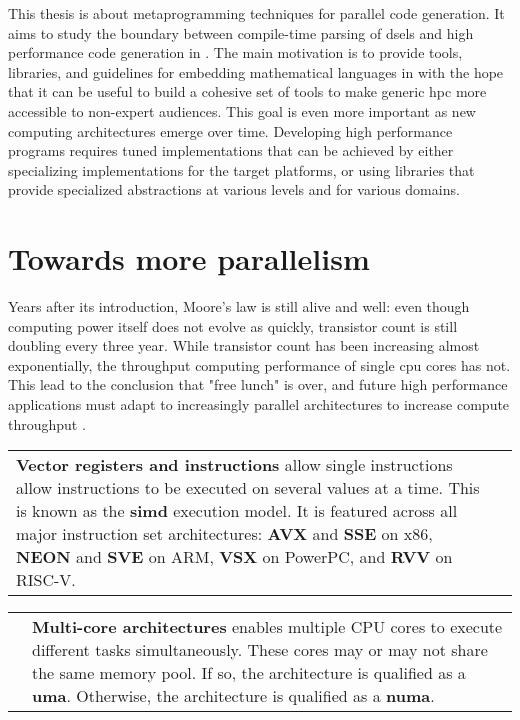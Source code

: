 \documentclass[main]{subfiles}
\begin{document}
This thesis is about metaprogramming techniques for parallel code generation.
It aims to study the boundary between compile-time parsing of
\glspl{dsel} and high performance code generation in \cpp.
The main motivation is to provide tools, libraries, and guidelines for embedding
mathematical languages in \cpp with the hope that it can be useful to build a
cohesive set of tools to make generic \gls{hpc} more accessible
to non-expert audiences. This goal is even more important as new computing
architectures emerge over time. Developing high performance programs requires
tuned implementations that can be achieved by either specializing
implementations for the target platforms, or using libraries that provide
specialized abstractions at various levels and for various domains.

\section*{
  Towards more parallelism
}

Years after its introduction, Moore's law is still alive and well:
even though computing power itself does not evolve as quickly,
transistor count is still doubling every three year.
While transistor count has been increasing almost exponentially,
the throughput computing performance of single \gls{cpu} cores has not.
This lead to the conclusion that "free lunch" is over, and future
high performance applications must adapt to increasingly parallel architectures
to increase compute throughput
\cite{concurrency-revolution, doi:10.1142/S0129626404001829}.

\begin{center}
\begin{tabular}{p{} p{}}
\textbf{Vector registers and instructions}\footnotemark{} allow single instructions allow
instructions to be executed on several values at a time. This is known as
the \textbf{\gls{simd}} execution model. It is featured across all major
instruction set architectures:
\textbf{AVX} and \textbf{SSE} on x86, \textbf{NEON} and \textbf{SVE} on ARM,
\textbf{VSX} on PowerPC, and \textbf{RVV} on RISC-V.
&
\raisebox{-.925\height}{}
\end{tabular}
\end{center}

\begin{center}
\begin{tabular}{p{} p{}}
\raisebox{-.925\height}{}
&
\textbf{Multi-core architectures} enables multiple CPU cores to execute
different tasks simultaneously. These cores may or may not share the same
memory pool. If so, the architecture is qualified as a \textbf{\gls{uma}}.
Otherwise, the architecture is qualified as a \textbf{\gls{numa}}.
\end{tabular}
\end{center}
\end{document}
